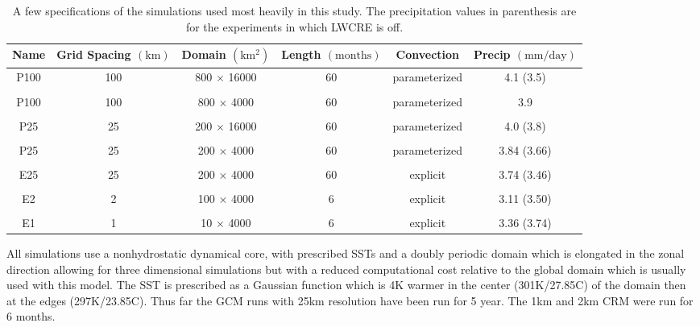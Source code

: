 \documentclass[11pt]{article}   	%
\begin{document}
\begin{table}
\begin{center}
\caption{A few specifications of the simulations used most heavily in this study.  The precipitation values in parenthesis are for the experiments
in which LWCRE is off.}
    \begin{tabular}{*{6}{c}}
    \hline
    \hline
 Name & Grid Spacing $(\mathrm{km})$ & Domain $ (\mathrm{km^2}) $& Length $(\mathrm{months}) $ & Convection & Precip $(\mathrm{mm/day})$   \\ \hline
  P100 &  100          &   800 $\times$ 16000    &  60              & parameterized           &  4.1 (3.5)          \\ 
    \\
  P100 &  100                & 800 $\times$ 4000     & 60            & parameterized         & 3.9                \\  
    \\
  P25 &  25             & 200 $\times$ 16000      & 60             & parameterized          & 4.0 (3.8)                \\  
    \\
  P25  &  25             & 200 $\times$ 4000      & 60             & parameterized           & 3.84 (3.66)               \\  
    \\
 E25  &   25          & 200 $\times$ 4000      & 60             & explicit          & 3.74 (3.46)               \\  
    \\
 E2   &   2          & 100 $\times$ 4000      & 6             & explicit          & 3.11 (3.50)                \\ 
    \\
 E1   &   1          & 10 $\times$ 4000      & 6             & explicit          & 3.36 (3.74)                \\  \hline

    \end{tabular}\par
    \label{tab:lambda}
\end{center}
\end{table}


All simulations use a nonhydrostatic dynamical core, with prescribed SSTs and a doubly periodic domain which is elongated in the zonal 
direction allowing for three dimensional simulations but with a reduced computational cost relative to the global domain which is usually 
used with this model.  The SST is prescribed as a Gaussian function which is 4K warmer in the center (301K/27.85C) of the domain then at the edges (297K/23.85C).  
Thus far the GCM runs with 25km resolution have been run for 5 year.  
The 1km and 2km CRM were run for 6 months.  
\end{document}
